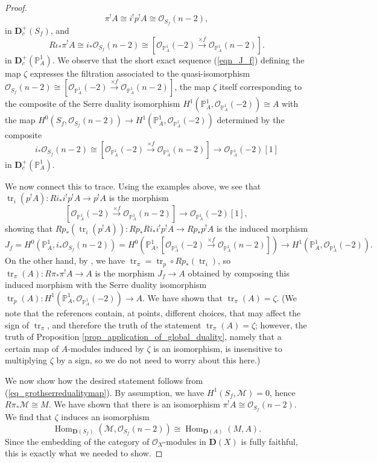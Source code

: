 \documentclass{article} %
\numberwithin{equation}{section}
\DeclareMathOperator{\Hom}{Hom}
\DeclareMathOperator{\tr}{tr}
\renewcommand{\P}{\mathbb{P}}
\newcommand{\cO}{\mathcal{O}}
\newcommand{\cM}{\mathcal{M}}
\begin{document}
\begin{proof}
    \[ \pi^! A \cong i^! p^! A  \cong \cO_{S_f}(n-2), \]
    in $\mathbf{D}^+_c(S_f)$, and
    \[ R \iota_\ast \pi^! A \cong i_*\cO_{S_f}(n-2) \cong [ \cO_{\P^1_A}(-2) \overset{\times f}{\to} \cO_{\P^1_A}(n-2) ]. \]
    in $\mathbf{D}^+_c(\P^1_A)$. We observe that the short exact sequence (\ref{eqn_J_f}) defining the map $\zeta$ expresses the filtration associated to the quasi-isomorphism $\cO_{S_f}(n-2) \cong [ \cO_{\P^1_A}(-2) \overset{\times f}{\to} \cO_{\P^1_A}(n-2) ]$, the map $\zeta$ itself corresponding to the composite of the Serre duality isomorphism $H^1(\P^1_A, \cO_{\P^1_A}(-2)) \cong A$ with the map $H^0(S_f, \cO_{S_f}(n-2)) \to H^1(\P^1_A,\cO_{\P^1_A}(-2))$ determined by the composite 
    \[ i_*\cO_{S_f}(n-2) \cong [ \cO_{\P^1_A}(-2) \overset{\times f}{\to} \cO_{\P^1_A}(n-2) ] \to \cO_{\P^1_A}(-2)[1] \]
    in $\mathbf{D}^+_c(\P^1_A)$. 
    
    We now connect this to trace. Using the examples above, we see that $\tr_i(p^!A) : R i_\ast i^! p^! A \to p^! A$ is the morphism 
    \[ [ \cO_{\P^1_A}(-2) \overset{\times f}{\to} \cO_{\P^1_A}(n-2) ] \to \cO_{\P^1_A}(-2)[1], \]
    showing that $R p_\ast(\tr_i(p^!A)) : R p_\ast R i_\ast i^! p^! A \to R p_\ast p^! A$ is the induced morphism
    \[ J_f = H^0(\P^1_A, i_\ast \cO_{S_f}(n-2)) = H^0(\P^1_A, [ \cO_{\P^1_A}(-2) \overset{\times f}{\to} \cO_{\P^1_A}(n-2) ]) \to H^1(\P^1_A, \cO_{\P^1_A}(-2)).  \]
    On the other hand, by \cite[Lemma 3.4.3(1)]{conrad-grothendieckduality}, we have $\tr_{\pi} = \tr_p \circ Rp_*(\tr_i)$, so $\tr_\pi(A) : R \pi_\ast \pi^! A \to A$ is the morphism $J_f \to A$ obtained by composing this induced morphism with the Serre duality isomorphism $\tr_p(A) : H^1(\P^1_A, \cO_{\P^1_A}(-2)) \to A$. We have shown that $\tr_\pi(A) = \zeta$. (We note that the references \cite{Har66,conrad-grothendieckduality} contain, at points, different choices, that may affect the sign of $\tr_\pi$, and therefore the truth of the statement $\tr_\pi(A) = \zeta$; however, the truth of Proposition \ref{prop_application_of_global_duality}, namely that a certain map of $A$-modules induced by $\zeta$ is an isomorphism, is insensitive to multiplying $\zeta$ by a sign, so we do not need to worry about this here.)

    We now show how the desired statement follows from (\ref{eq_grothserredualitymap}). By assumption, we have $H^1(S_f, \cM) = 0$, hence $R\pi_\ast \cM \cong M$. We have shown that there is an isomorphism $\pi^! A \cong \cO_{S_f}(n-2)$. We find that $\zeta$ induces an isomorphism
    \[ \Hom_{\mathbf{D}(S_f)}(\cM, \cO_{S_f}(n-2)) \cong \Hom_{\mathbf{D}(A)}(M, A). \]
    Since the embedding of the category of $\cO_X$-modules in $\mathbf{D}(X)$ is fully faithful, this is exactly what we needed to show. 
\end{proof}
\end{document}
